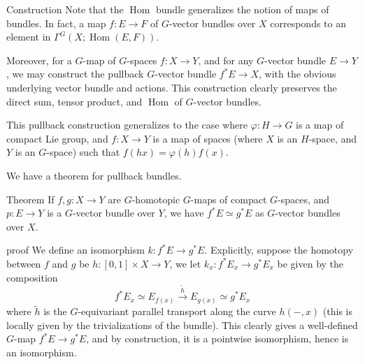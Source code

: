 \documentclass{beamer}
\DeclareMathOperator{\Hom}{\mathrm{Hom}}
\begin{document}
\begin{frame}
	\begin{block}{Construction}
		Note that the $\Hom$ bundle generalizes the notion of maps of bundles. In fact, a map $f:E\to F$ of $G$-vector bundles over $X$ corresponds to an element in $\Gamma^G(X;\Hom(E,F))$. 

		Moreover, for a $G$-map of $G$-spaces $f:X\to Y$, and for any $G$-vector bundle $E\to Y$, we may construct the pullback $G$-vector bundle $f^*E\to X$, with the obvious underlying vector bundle and actions. This construction clearly preserves the direct sum, tensor product, and $\Hom$ of $G$-vector bundles. 

		This pullback construction generalizes to the case where $\varphi:H\to G$ is a map of compact Lie group, and $f:X\to Y$ is a map of spaces (where $X$ is an $H$-space, and $Y$ is an $G$-space) such that $f(hx)=\varphi(h)f(x)$. 
	\end{block}
	We have a theorem for pullback bundles. 
\end{frame}

\begin{frame}
	\begin{alertblock}{Theorem}
		If $f,g:X\to Y$ are $G$-homotopic $G$-maps of compact $G$-spaces, and $p:E\to Y$ is a $G$-vector bundle over $Y$, we have $f^*E\simeq g^*E$ as $G$-vector bundles over $X$. 
	\end{alertblock}
	\begin{block}{proof}
		We define an isomorphism $k:f^*E\to g^*E$. Explicitly, suppose the homotopy between $f$ and $g$ be $h:[0,1]\times X\to Y$, we let $k_x:f^*E_x\to g^*E_x$ be given by the composition 
		\[ f^*E_x\simeq E_{f(x)}\xrightarrow{\tilde{h}}E_{g(x)}\simeq g^*E_x \]
		where $\tilde{h}$ is the $G$-equivariant parallel transport along the curve $h(-,x)$ (this is locally given by the trivializations of the bundle). This clearly gives a well-defined $G$-map $f^*E\to g^*E$, and by construction, it is a pointwise isomorphism, hence is an isomorphism. 
	\end{block}
\end{frame}
\end{document}
